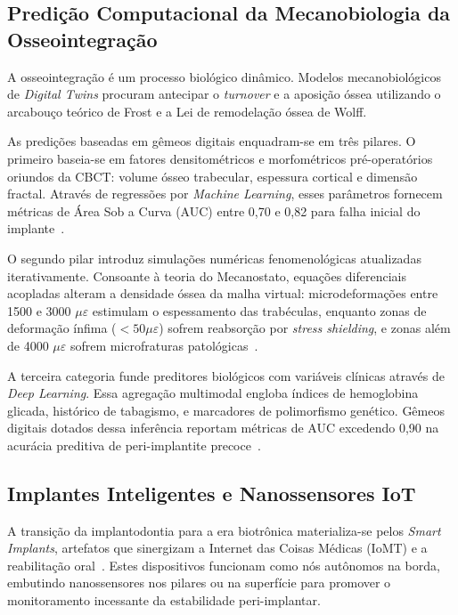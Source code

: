 \subsection{Predição Computacional da Mecanobiologia da Osseointegração}

A osseointegração é um processo biológico dinâmico. Modelos mecanobiológicos de \textit{Digital Twins} procuram antecipar o \textit{turnover} e a aposição óssea utilizando o arcabouço teórico de Frost e a Lei de remodelação óssea de Wolff. 

As predições baseadas em gêmeos digitais enquadram-se em três pilares. O primeiro baseia-se em fatores densitométricos e morfométricos pré-operatórios oriundos da CBCT: volume ósseo trabecular, espessura cortical e dimensão fractal. Através de regressões por \textit{Machine Learning}, esses parâmetros fornecem métricas de Área Sob a Curva (AUC) entre 0,70 e 0,82 para falha inicial do implante~\cite{khoshfekr2025digital}.

O segundo pilar introduz simulações numéricas fenomenológicas atualizadas iterativamente. Consoante à teoria do Mecanostato, equações diferenciais acopladas alteram a densidade óssea da malha virtual: microdeformações entre 1500 e 3000 $\mu\varepsilon$ estimulam o espessamento das trabéculas, enquanto zonas de deformação ínfima ($< 50 \mu\varepsilon$) sofrem reabsorção por \textit{stress shielding}, e zonas além de 4000 $\mu\varepsilon$ sofrem microfraturas patológicas~\cite{zhang2024recursive}.

A terceira categoria funde preditores biológicos com variáveis clínicas através de \textit{Deep Learning}. Essa agregação multimodal engloba índices de hemoglobina glicada, histórico de tabagismo, e marcadores de polimorfismo genético. Gêmeos digitais dotados dessa inferência reportam métricas de AUC excedendo 0,90 na acurácia preditiva de peri-implantite precoce~\cite{duggal2026exploring}.

\subsection{Implantes Inteligentes e Nanossensores IoT}

A transição da implantodontia para a era biotrônica materializa-se pelos \textit{Smart Implants}, artefatos que sinergizam a Internet das Coisas Médicas (IoMT) e a reabilitação oral~\cite{aisoc2026realising}. Estes dispositivos funcionam como nós autônomos na borda, embutindo nanossensores nos pilares ou na superfície para promover o monitoramento incessante da estabilidade peri-implantar.

